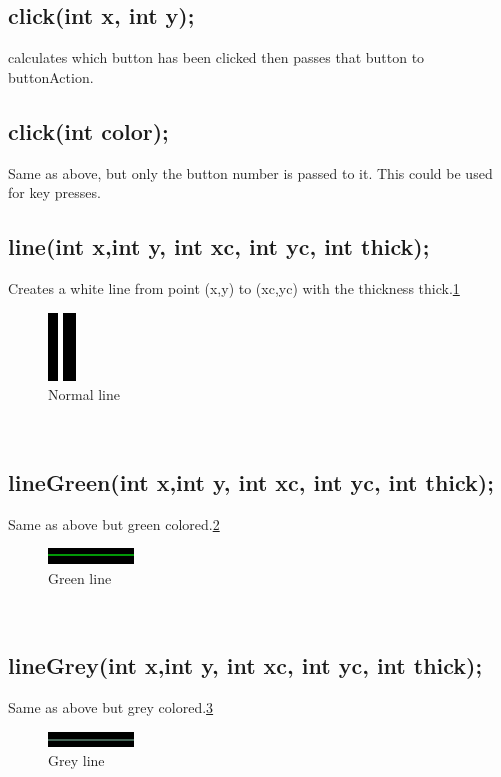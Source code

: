\documentclass{article}
\begin{document}
\subsection{click(int x, int y);}
calculates which button has been clicked then passes that button to buttonAction.\\

\subsection{click(int color);}
Same as above, but only the button number is passed to it. This could be used for key presses.\\

\subsection{line(int x,int y, int xc, int yc, int thick);}
Creates a white line from point (x,y) to (xc,yc) with the thickness thick.\ref{line}\\
\begin{figure}[htp]
  \begin{center}
\includegraphics[]{line}
  \end{center}
  \caption{Normal line}
\label{line}
\end{figure}\\

\subsection{lineGreen(int x,int y, int xc, int yc, int thick);}
Same as above but green colored.\ref{linegreen}\\
\begin{figure}[htp]
  \begin{center}
\includegraphics[]{linegreen}
  \end{center}
  \caption{Green line}
\label{linegreen}
\end{figure}\\

\subsection{lineGrey(int x,int y, int xc, int yc, int thick);}
Same as above but grey colored.\ref{linegrey}\\
\begin{figure}[htp]
  \begin{center}
\includegraphics[]{linegrey}
  \end{center}
  \caption{Grey line}
\label{linegrey}
\end{figure}\\
\end{document}
